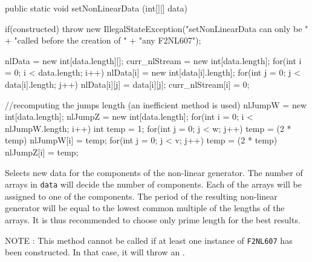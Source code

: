 \begin{htmlonly}
\end{htmlonly}
\begin{code}

   public static void setNonLinearData (int[][] data) \begin{hide} {
      if(constructed)
         throw new IllegalStateException("setNonLinearData can only be " +
                                         "called before the creation of " +
                                         "any F2NL607");

      nlData = new int[data.length][];
      curr_nlStream = new int[data.length];
      for(int i = 0; i < data.length; i++) {
         nlData[i] = new int[data[i].length];
         for(int j = 0; j < data[i].length; j++)
            nlData[i][j] = data[i][j];
         curr_nlStream[i] = 0;
      }

      //recomputing the jumps length (an inefficient method is used)
      nlJumpW = new int[data.length];
      nlJumpZ = new int[data.length];
      for(int i = 0; i < nlJumpW.length; i++) {
         int temp = 1;
         for(int j = 0; j < w; j++)
            temp = (2 * temp) %
         nlJumpW[i] = temp;
         for(int j = 0; j < v; j++)
            temp = (2 * temp) %
         nlJumpZ[i] = temp;
      }
   } \end{hide}
\end{code}
\begin{tabb} Selects new data for the components of the non-linear generator.
  The number of arrays in \texttt{data} will decide the number of components.
  Each of the arrays will be assigned to one of the components. The period
  of the resulting non-linear generator will be equal to the lowest common
  multiple of the lengths of the arrays. It is thus recommended to choose
  only prime length for the best results.

  NOTE : This method cannot be called if at least one instance of
  \texttt{F2NL607} has been constructed. In that case, it will throw
  an .
\end{tabb}
\begin{htmlonly}
\end{htmlonly}
